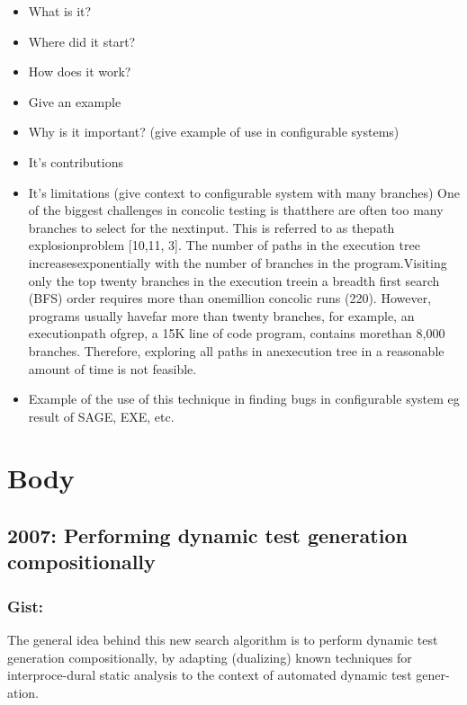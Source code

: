 \documentclass[	runningheads,
				a4paper]{llncs}
\begin{document}
\begin{itemize}
	\item What is it?
	\item Where did it start?
	\item How does it work?
	\item Give an example
	\item Why is it important? (give example of use in configurable systems)
	\item It's contributions
	\item It's limitations (give context to configurable system with many branches)
	One  of  the  biggest  challenges  in  concolic  testing  is  thatthere  are  often  too  many  branches  to  select  for  the  nextinput.  This is referred to as thepath explosionproblem [10,11, 3].  The number of paths in the execution tree increasesexponentially with the number of branches in the program.Visiting only the top twenty branches in the execution treein a breadth first search (BFS) order requires more than onemillion concolic runs (220).  However, programs usually havefar more than twenty branches,  for example,  an executionpath  ofgrep,  a  15K  line  of  code  program,  contains  morethan  8,000  branches.   Therefore,  exploring  all  paths  in  anexecution tree in a reasonable amount of time is not feasible.

	\item Example of the use of this technique in finding bugs in configurable system eg result of SAGE, EXE, etc.
\end{itemize}


\section{Body}

\subsection{2007: Performing dynamic test generation compositionally}
\cite[paper]{godefroid2007compositional}

\subsubsection{Gist:}
The general idea behind this new search algorithm is to perform dynamic  test generation compositionally, by adapting (dualizing) known techniques for interproce-dural static analysis to the context of automated dynamic test gener-ation.
\end{document}

